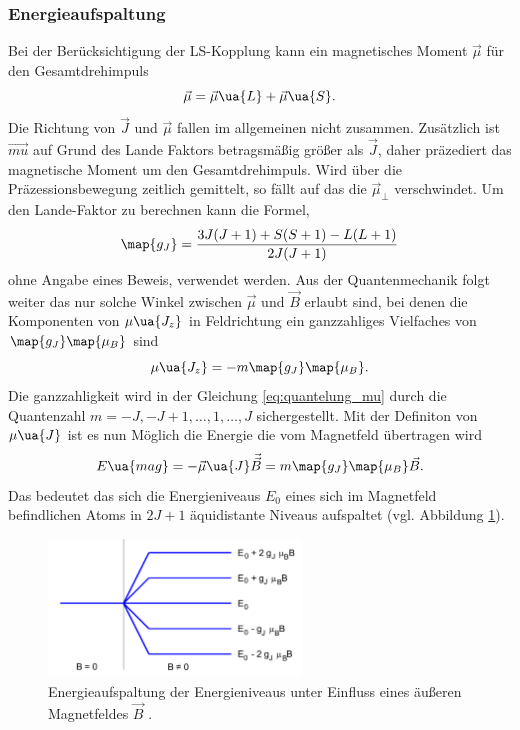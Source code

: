 \subsubsection{Energieaufspaltung}
Bei der Berücksichtigung der LS-Kopplung kann ein magnetisches Moment $\vec{\mu}$ für den Gesamtdrehimpuls
\begin{equation*}
  \vec{\mu}=\vec{\mu}\ua{L} + \vec{\mu}\ua{S}.
\end{equation*}
Die Richtung von $\vec{J}$ und $\vec{\mu}$ fallen im allgemeinen nicht zusammen. Zusätzlich ist
$\vec{mu}$ auf Grund des Lande Faktors betragsmäßig größer als $\vec{J}$, daher präzediert das magnetische Moment um den Gesamtdrehimpuls.
Wird über die Präzessionsbewegung zeitlich gemittelt, so fällt auf das die $\vec{\mu}_{\perp}$ verschwindet.
Um den Lande-Faktor zu berechnen kann die Formel,
\begin{equation}
  \label{eq:lande_faktor}
  \map{g_J}=\frac{3J(J+1)+S(S+1)-L(L+1)}{2J(J+1)}
\end{equation}
ohne Angabe eines Beweis, verwendet werden.
Aus der Quantenmechanik folgt weiter das nur solche Winkel zwischen $\vec{\mu}$ und
$\vec{B}$ erlaubt sind, bei denen die Komponenten von $\mu\ua{J_z}$ in Feldrichtung ein ganzzahliges Vielfaches von
$\map{g_J}\map{\mu_B}$ sind
\begin{equation}
  \label{eq:quantelung_mu}
  \mu\ua{J_z}=-m\map{g_J}\map{\mu_B}.
\end{equation}
Die ganzzahligkeit wird in der Gleichung \eqref{eq:quantelung_mu} durch die Quantenzahl
$m=-J,-J+1,\dots,1,\dots, J$ sichergestellt.
Mit der Definiton von $\mu\ua{J}$ ist es nun Möglich die Energie die vom Magnetfeld
übertragen wird
\begin{equation}
  \label{eq:energie_mag}
  E\ua{mag}=-\vec{\mu}\ua{J}\vec{\vec{B}}=m\map{g_J}\map{\mu_B}\vec{B}.
\end{equation}
Das bedeutet das sich die Energieniveaus $E_0$ eines sich im Magnetfeld befindlichen Atoms
in $2J+1$ äquidistante Niveaus aufspaltet (vgl. Abbildung \ref{fig: energie_magnet}).

\begin{figure}[h]
  \centering
  \includegraphics[width=0.6\textwidth]{pics/energieaufspaltung_magnetfeld.png}
  \caption{Energieaufspaltung der Energieniveaus unter Einfluss eines äußeren Magnetfeldes $\vec{B}$ \cite{anleitung27}.}
  \label{fig: energie_magnet}
\end{figure}

